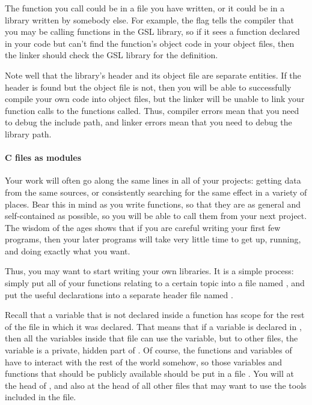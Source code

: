 \documentclass[12pt]{article}
\begin{document}
The function you call could be in a file you have written, or it could be
in a library written by somebody else.  For example, the 
flag tells the compiler that you may be calling functions in the GSL
library, so if it sees a function declared in your code but can't find
the function's object code in your object files, then the linker should check
the GSL library for the definition.

Note well that the library's header and its object file are separate
entities. If the header is found but the object file is not, then you
will be able to successfully compile your own code into object files,
but the linker will be unable to link your function calls to the
functions called. Thus, compiler errors mean that you need to debug the
include path, and linker errors mean that you need to debug the library path.


\paragraph{C files as modules}
Your work will often go along the same lines in all of your projects:
getting data from the same sources, or consistently searching for the
same effect in a variety of places. Bear this in mind as you write
functions, so that they are as general and self-contained as possible,
so you will be able to call them from your next project. The wisdom of
the ages shows that if you are careful writing your first few programs,
then your later programs will take very little time to get up, running,
and doing exactly what you want.

Thus, you may want to start writing your own libraries. It is a simple
process: simply put all of your functions relating to a certain topic
into a file named , and put the useful declarations
into a separate header file named .

Recall that a variable that is not declared inside a function has scope
for the rest of the file in which it was declared. That means that if a
variable is declared in , then all the variables inside
that file can use the variable, but to other  files, the
variable is a private, hidden part of . Of course, the
functions and variables of  have to interact with the
rest of the world somehow, so those variables and functions that should
be publicly available should be put in a file . You
will  at the head of ,
and also at the head of all other files that may want to use the tools
included in the  file.
\end{document}
